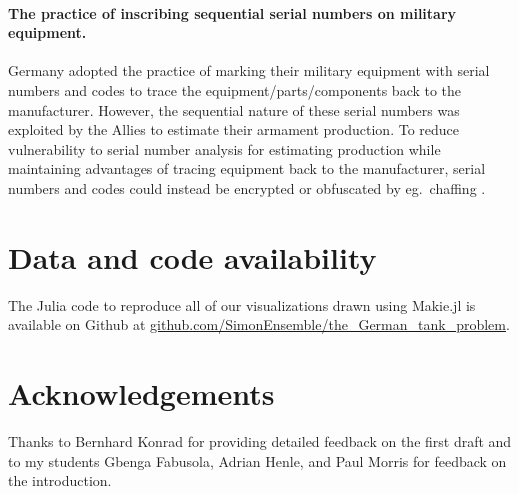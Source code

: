 \documentclass[11pt, oneside]{article}
\begin{document}
\paragraph{The practice of inscribing sequential serial numbers on military equipment.}
Germany adopted the practice of marking their military equipment with serial numbers and codes to trace the equipment/parts/components back to the manufacturer. However, the sequential nature of these serial numbers was exploited by the Allies to estimate their armament production. 
To reduce vulnerability to serial number analysis for estimating production while maintaining advantages of tracing equipment back to the manufacturer, serial numbers and codes could instead be encrypted \cite{delfs2002introduction} or obfuscated by eg.\ chaffing \cite{rivest1998chaffing}. 

\section*{Data and code availability} The Julia \cite{bezanson2012julia} code to reproduce all of our visualizations drawn using Makie.jl \cite{DanischKrumbiegel2021} is available on Github at \url{github.com/SimonEnsemble/the_German_tank_problem}.

\section*{Acknowledgements}
Thanks to Bernhard Konrad for providing detailed feedback on the first draft and to my students Gbenga Fabusola, Adrian Henle, and Paul Morris for feedback on the introduction. 



\end{document}
